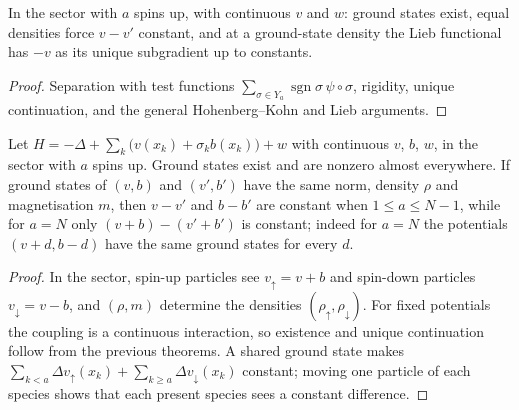 \begin{theorem}
  \label{thm:line_hk_young}
  \leanok
  In the sector with $a$ spins up, with continuous $v$ and $w$: ground states exist, equal densities force $v-v'$
  constant, and at a ground-state density the Lieb functional has $-v$ as its unique subgradient up to constants.
\end{theorem}
\begin{proof}
  \leanok
  Separation with test functions $\sum_{\sigma\in Y_a}\operatorname{sgn}\sigma\,\psi\circ\sigma$, rigidity, unique
  continuation, and the general Hohenberg--Kohn and Lieb arguments.
\end{proof}

\begin{theorem}
  \label{thm:line_sdft}
  \leanok
  Let $H=-\Delta+\sum_k\big(v(x_k)+\sigma_kb(x_k)\big)+w$ with continuous $v$, $b$, $w$, in the sector with $a$ spins up.
  Ground states exist and are nonzero almost everywhere. If ground states of $(v,b)$ and $(v',b')$ have the same norm,
  density $\rho$ and magnetisation $m$, then $v-v'$ and $b-b'$ are constant when $1\le a\le N-1$, while for $a=N$
  only $(v+b)-(v'+b')$ is constant; indeed for $a=N$ the potentials $(v+d,b-d)$ have the same ground states for
  every $d$.
\end{theorem}
\begin{proof}
  \leanok
  In the sector, spin-up particles see $v_\uparrow=v+b$ and spin-down particles $v_\downarrow=v-b$, and $(\rho,m)$
  determine the densities $(\rho_\uparrow,\rho_\downarrow)$. For fixed potentials the coupling is a continuous
  interaction, so existence and unique continuation follow from the previous theorems. A shared ground state makes
  $\sum_{k<a}\Delta v_\uparrow(x_k)+\sum_{k\ge a}\Delta v_\downarrow(x_k)$ constant; moving one particle of each
  species shows that each present species sees a constant difference.
\end{proof}

